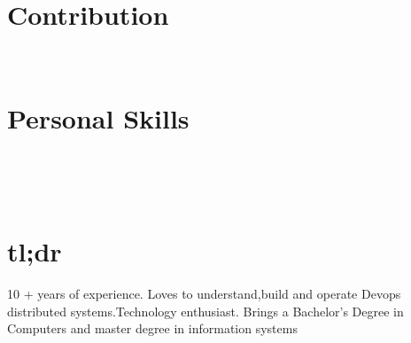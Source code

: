 \documentclass[]{friggeri-cv}
\begin{document}
\begin{aside}
  \section{Contribution}
    ~
  \section{Personal Skills}
    ~
\end{aside}
~

\section{tl;dr}
\begin{entrylist}
  \entry
    {}
    {}
   {}
  {10 + years of experience. Loves to understand,build and operate Devops distributed systems.Technology enthusiast. Brings a Bachelor’s Degree in Computers and master degree in information systems }
\end{entrylist} 
\end{document}
